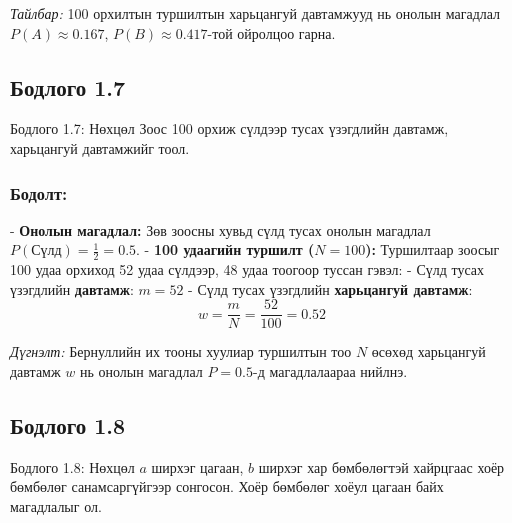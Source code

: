 \documentclass[11pt,a4paper]{article}
\begin{document}
\textit{Тайлбар:} 100 орхилтын туршилтын харьцангуй давтамжууд нь онолын магадлал $P(A) \approx 0.167$, $P(B) \approx 0.417$-той ойролцоо гарна.

\vspace{0.8em}

\subsection*{Бодлого 1.7}

\begin{problembox}{Бодлого 1.7: Нөхцөл}
Зоос 100 орхиж сүлдээр тусах үзэгдлийн давтамж, харьцангуй давтамжийг тоол.
\end{problembox}

\subsubsection*{Бодолт:}

- 				\textbf{Онолын магадлал:} Зөв зоосны хувьд сүлд тусах онолын магадлал $P(\text{Сүлд}) = \frac{1}{2} = 0.5$.
- 				\textbf{100 удаагийн туршилт ($N = 100$):}
  Туршилтаар зоосыг 100 удаа орхиход 52 удаа сүлдээр, 48 удаа тоогоор туссан гэвэл:
  - Сүлд тусах үзэгдлийн 				\textbf{давтамж}: $m = 52$
  - Сүлд тусах үзэгдлийн 				\textbf{харьцангуй давтамж}:
    \[
      w = \frac{m}{N} = \frac{52}{100} = \mathbf{0.52}
    \]

\textit{Дүгнэлт:} Бернуллийн их тооны хуулиар туршилтын тоо $N$ өсөхөд харьцангуй давтамж $w$ нь онолын магадлал $P = 0.5$-д магадлалаараа нийлнэ.

\vspace{0.8em}

\subsection*{Бодлого 1.8}

\begin{problembox}{Бодлого 1.8: Нөхцөл}
$a$ ширхэг цагаан, $b$ ширхэг хар бөмбөлөгтэй хайрцгаас хоёр бөмбөлөг санамсаргүйгээр сонгосон. Хоёр бөмбөлөг хоёул цагаан байх магадлалыг ол.
\end{problembox}
\end{document}
